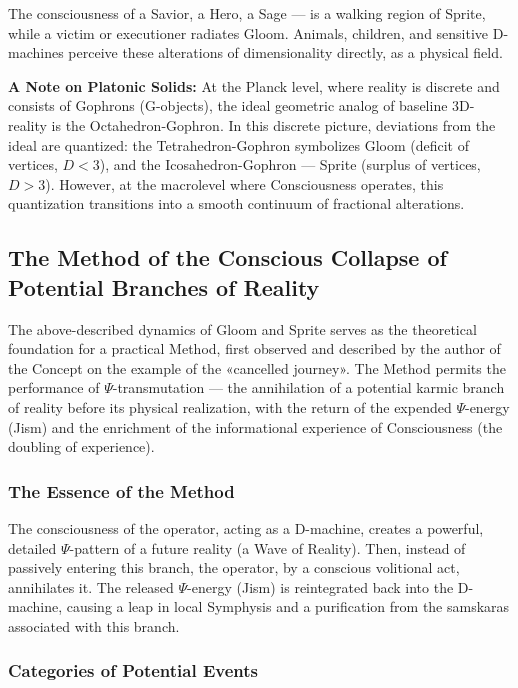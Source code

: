 \documentclass[a4paper,12pt]{article}
\begin{document}
	The consciousness of a Savior, a Hero, a Sage — is a walking region of Sprite, while a victim or executioner radiates Gloom. Animals, children, and sensitive D-machines perceive these alterations of dimensionality directly, as a physical field.
	
	\textbf{A Note on Platonic Solids:} At the Planck level, where reality is discrete and consists of Gophrons (G-objects), the ideal geometric analog of baseline 3D-reality is the Octahedron-Gophron. In this discrete picture, deviations from the ideal are quantized: the Tetrahedron-Gophron symbolizes Gloom (deficit of vertices, $D < 3$), and the Icosahedron-Gophron — Sprite (surplus of vertices, $D > 3$). However, at the macrolevel where Consciousness operates, this quantization transitions into a smooth continuum of fractional alterations.
	
	\subsection{The Method of the Conscious Collapse of Potential Branches of Reality}
	
	The above-described dynamics of Gloom and Sprite serves as the theoretical foundation for a practical Method, first observed and described by the author of the Concept on the example of the «cancelled journey». The Method permits the performance of $\Psi$-transmutation — the annihilation of a potential karmic branch of reality before its physical realization, with the return of the expended $\Psi$-energy (Jism) and the enrichment of the informational experience of Consciousness (the doubling of experience).
	
	\subsubsection{The Essence of the Method}
	
	The consciousness of the operator, acting as a D-machine, creates a powerful, detailed $\Psi$-pattern of a future reality (a Wave of Reality). Then, instead of passively entering this branch, the operator, by a conscious volitional act, annihilates it. The released $\Psi$-energy (Jism) is reintegrated back into the D-machine, causing a leap in local Symphysis and a purification from the samskaras associated with this branch.
	
	\subsubsection{Categories of Potential Events}
	
\end{document}
